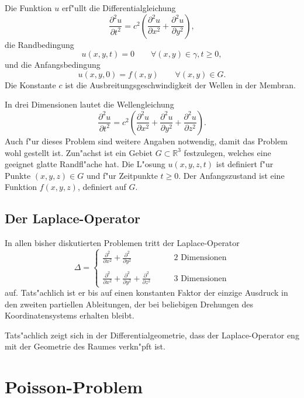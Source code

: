 Die Funktion $ u $
erf"ullt die Differentialgleichung
\[
\frac{\partial^2 u }{\partial t^2}
=c^2\left(\frac{\partial^2 u }{\partial x^2}+\frac{\partial^2 u }{\partial y^2}\right),
\]
die Randbedingung
\[
 u (x,y,t)=0\qquad \forall (x,y)\in\gamma,t\ge 0,
\]
und die Anfangsbedingung
\[
 u (x,y,0)=f(x,y)\qquad \forall (x,y)\in G.
\]
Die Konstante $c$ ist die Ausbreitungsgeschwindigkeit der Wellen in der Membran.

In drei Dimensionen lautet
die Wellengleichung 
\[
\frac{\partial^2 u }{\partial t^2}
=c^2\left(\frac{\partial^2 u }{\partial x^2}
+\frac{\partial^2 u }{\partial y^2}
+\frac{\partial^2 u }{\partial z^2}
\right).
\]
Auch f"ur dieses Problem sind weitere Angaben notwendig, damit das Problem
wohl gestellt ist.
Zun"achst ist ein Gebiet $G\subset \mathbb R^3$ festzulegen, welches
eine geeignet glatte Randfl"ache hat.
Die L"osung $ u (x,y,z,t)$ ist definiert f"ur Punkte $(x,y,z)\in G$
und f"ur Zeitpunkte $t\ge 0$.
Der Anfangszustand ist eine Funktion $f(x,y,z)$,
definiert auf $G$.

\subsection{Der Laplace-Operator\label{beispiele:laplaceoperator}}
In allen bisher diskutierten Problemen tritt der Laplace-Operator
\[
\Delta
=
\begin{cases}
\displaystyle
\frac{\partial^2}{\partial x^2}
+\frac{\partial^2}{\partial y^2}&\qquad\text{2 Dimensionen}\\
\\
\displaystyle
\frac{\partial^2}{\partial x^2}
+\frac{\partial^2}{\partial y^2}
+\frac{\partial^2}{\partial z^2}&\qquad\text{3 Dimensionen}
\end{cases}
\]
auf. Tats"achlich ist er bis auf einen konstanten Faktor der einzige Ausdruck
in den zweiten partiellen Ableitungen, der bei beliebigen Drehungen des
Koordinatensystems erhalten bleibt.

Tats"achlich zeigt sich in der Differentialgeometrie, dass der Laplace-Operator
eng mit der Geometrie des Raumes verkn"pft ist.

\section{Poisson-Problem}

